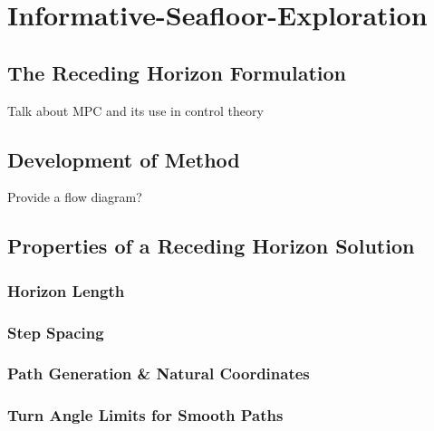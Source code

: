 \chapter{Informative-Seafloor-Exploration}
\label{Informative-Seafloor-Exploration}

	\section{The Receding Horizon Formulation}
	
		Talk about MPC and its use in control theory
		
	\section{Development of Method}
	
%		
		
		Provide a flow diagram?
		
	\section{Properties of a Receding Horizon Solution}
	
		\subsection{Horizon Length}
		
		\subsection{Step Spacing}
		
		\subsection{Path Generation \& Natural Coordinates}
		
		\subsection{Turn Angle Limits for Smooth Paths}
		
